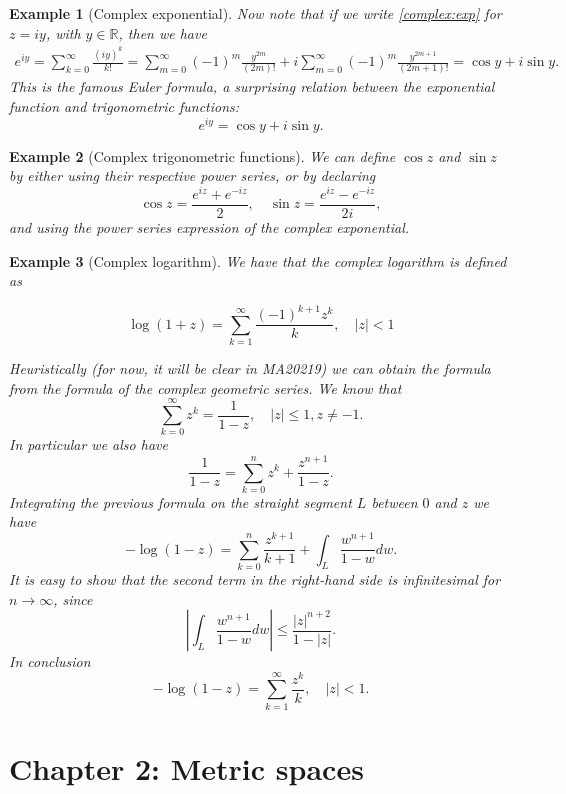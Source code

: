 \documentclass[a4paper,reqno]{amsart}
\numberwithin{equation}{section}
\newtheorem{example}{Example}
\def\R{\mathbb{R}}
\begin{document}
\begin{example}[Complex exponential]
Now note that if we write \eqref{complex:exp} for $z=iy$, with $y\in \R$, then we have
\begin{align*}
e^{iy} = \sum_{k=0}^\infty \frac{(iy)^k}{k!} = \sum_{m=0}^\infty (-1)^m\frac{y^{2m}}{(2m)!} + i \sum_{m=0}^\infty (-1)^m\frac{y^{2m+1}}{(2m+1)!}  = \cos y+ i\sin y.
\end{align*}
This is the famous Euler formula, a surprising relation between the exponential function and trigonometric functions:
$$
e^{iy} = \cos y + i \sin y.
$$
\end{example}


\begin{example}[Complex trigonometric functions]
We can define $\cos z$ and $\sin z$ by either using their respective power series, or by declaring
$$
\cos z= \frac{e^{iz} + e^{-iz}}{2}, \quad \sin z= \frac{e^{iz} - e^{-iz}}{2i},
$$
and using the power series expression of the complex exponential.
\end{example}


\begin{example}[Complex logarithm]
We have that the complex logarithm is defined as

$$
\log(1+z) = \sum_{k=1}^{\infty} \frac{(-1)^{k+1}z^{k}}{k}, \quad |z|<1
$$

Heuristically (for now, it will be clear in MA20219) we can obtain the formula from the formula of the complex geometric series.
We know that
$$
\sum_{k=0}^\infty z^k = \frac{1}{1-z}, \quad |z|\le1, z\neq -1.
$$
In particular we also have
$$
\frac{1}{1-z} = \sum_{k=0}^n z^k + \frac{z^{n+1}}{1-z}.
$$
Integrating the previous formula on the straight segment $L$ between $0$ and $z$ we have
$$
-\log(1-z) = \sum_{k=0}^n \frac{z^{k+1}}{k+1} + \int_L\frac{w^{n+1}}{1-w} dw.
$$
It is easy to show that the second term in the right-hand side is infinitesimal for $n\to \infty$, since
$$
\left|\int_L\frac{w^{n+1}}{1-w} dw\right|\leq \frac{|z|^{n+2}}{1-|z|}.
$$
In conclusion
$$
-\log(1-z) = \sum_{k=1}^{\infty} \frac{z^{k}}{k}, \quad |z|<1.
$$
\end{example}




\newpage


\section{Chapter 2: Metric spaces}

\end{document}

